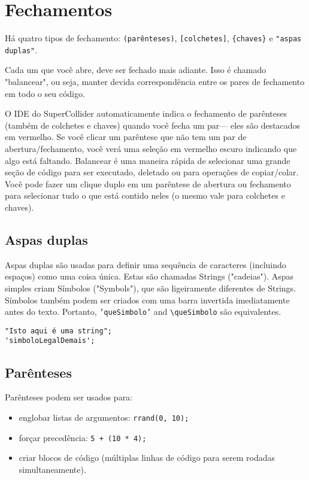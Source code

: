 \section{Fechamentos}

Há quatro tipos de fechamento: \texttt{(parênteses)}, \texttt{[colchetes]}, \texttt{\{chaves\}} e \texttt{"aspas duplas"}.

Cada um que você abre, deve ser fechado mais adiante. Isso é chamado "balancear", ou seja, manter devida correspondência entre os pares de fechamento em todo o seu código.

O IDE do SuperCollider automaticamente indica o fechamento de parênteses (também de colchetes e chaves) quando você fecha um par--- eles são destacados em vermelho. Se você clicar um parêntese que não tem um par de abertura/fechamento, você verá uma seleção em vermelho escuro indicando que algo está faltando. Balancear é uma maneira rápida de selecionar uma grande seção de código para ser executado, deletado ou para operações de copiar/colar. Você pode fazer um clique duplo em um parêntese de abertura ou fechamento para selecionar tudo o que está contido neles (o mesmo vale para colchetes e chaves).

\subsection{Aspas duplas}

Aspas duplas são usadas para definir uma sequência de caracteres (incluindo espaços) como uma coisa única. Estas são chamadas Strings ("cadeias"). Aspas simples criam Símbolos ("Symbols"), que são ligeiramente diferentes de Strings. Símbolos também podem ser criados com uma barra invertida imediatamente antes do texto. Portanto, \texttt{'queSimbolo'} and \texttt{\textbackslash queSimbolo} são equivalentes.

\begin{lstlisting}[style=SuperCollider-IDE, basicstyle=\scttfamily\footnotesize]
"Isto aqui é uma string";
'simboloLegalDemais';
\end{lstlisting}

\subsection{Parênteses}

Parênteses podem ser usados para:

\begin{itemize}
\item englobar listas de argumentos: \texttt{rrand(0, 10);}
\item forçar precedência: \texttt{5 + (10 * 4);}
\item criar blocos de código (múltiplas linhas de código para serem rodadas simultaneamente).
\end{itemize} 

